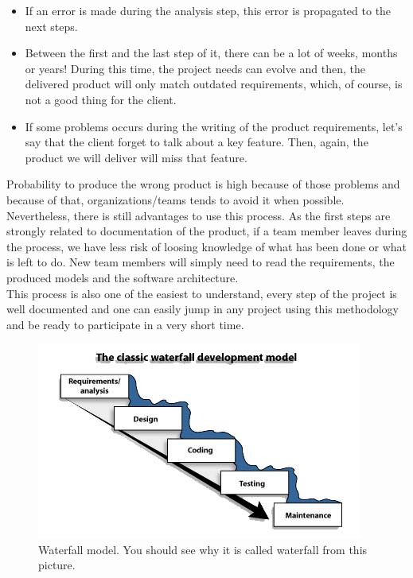 \documentclass[12pt]{article}
\theoremstyle{definition}
\theoremstyle{definition}
\theoremstyle{remark}
\begin{document}
\begin{itemize}

\item If an error is made during the analysis step, this error is propagated to the next steps.
\item Between the first and the last step of it, there can be a lot of weeks, months or years! During this time, the project needs can evolve and then, the delivered product will only match outdated requirements, which, of course, is not a good thing for the client.
\item If some problems occurs during the writing of the product requirements, let's say that the client forget to talk about a key feature. Then, again, the product we will deliver will miss that feature.

\end{itemize}

Probability to produce the wrong product is high because of those problems and because of that, organizations/teams tends to avoid it when possible. Nevertheless, there is still advantages to use this process. As the first steps are strongly related to documentation of the product, if a team member leaves during the process, we have less risk of loosing knowledge of what has been done or what is left to do. New team members will simply need to read the requirements, the produced models and the software architecture.\\

This process is also one of the easiest to understand, every step of the project is well documented and one can easily jump in any project using this methodology and be ready to participate in a very short time.\\

\begin{figure}
    \centering
    \includegraphics[scale=0.8]{waterfall.jpg}
    \caption{Waterfall model. You should see why it is called waterfall from this picture.}
    \label{Waterfall}
\end{figure}
\end{document}

